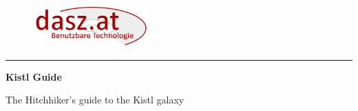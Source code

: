 \begin{figure}
	\includegraphics[width=0.4\textwidth]{images/logo.png}
\end{figure}
\hrule

\vspace*{1.5cm}

\begin{center}
 {\huge \bf Kistl Guide }
\end{center}

\vspace*{1cm}

\begin{center}
{\huge The Hitchhiker's guide to the Kistl galaxy }
\end{center}


